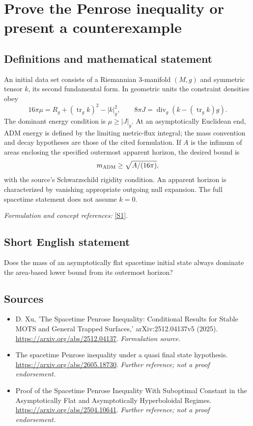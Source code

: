 \documentclass[11pt]{article}
\begin{document}
\section*{\texorpdfstring{Prove the Penrose inequality or present a counterexample}{Prove the Penrose inequality or present a counterexample}}\label{37}
\subsection{Definitions and mathematical statement}
An initial data set consists of a Riemannian $3$-manifold $(M,g)$ and symmetric tensor $k$, its second fundamental form. In geometric units the constraint densities obey
\[
 16\pi\mu=R_g+(\operatorname{tr}_gk)^2-|k|_g^2,\qquad
 8\pi J=\operatorname{div}_g(k-(\operatorname{tr}_gk)g).
\]
The dominant energy condition is $\mu\ge|J|_g$. At an asymptotically Euclidean end, ADM energy is defined by the limiting metric-flux integral; the mass convention and decay hypotheses are those of the cited formulation. If $A$ is the infimum of areas enclosing the specified outermost apparent horizon, the desired bound is
\[
 m_{\rm ADM}\ge\sqrt{A/(16\pi)},
\]
with the source's Schwarzschild rigidity condition. An apparent horizon is characterized by vanishing appropriate outgoing null expansion. The full spacetime statement does not assume $k=0$.
\par\smallskip\textit{Formulation and concept references:} \href{https://arxiv.org/abs/2512.04137}{[S1]}.

\subsection{Short English statement}
Does the mass of an asymptotically flat spacetime initial state always dominate the area-based lower bound from its outermost horizon?
\subsection{Sources}
\begin{itemize}
\item[S1]D. Xu, 'The Spacetime Penrose Inequality: Conditional Results for Stable MOTS and General Trapped Surfaces,' arXiv:2512.04137v5 (2025).
\url{https://arxiv.org/abs/2512.04137}.
\textit{Formulation source.}
\item[S2]The spacetime Penrose inequality under a quasi final state hypothesis.
\url{https://arxiv.org/abs/2605.18730}.
\textit{Further reference; not a proof endorsement.}
\item[S3]Proof of the Spacetime Penrose Inequality With Suboptimal Constant in the Asymptotically Flat and Asymptotically Hyperboloidal Regimes.
\url{https://arxiv.org/abs/2504.10641}.
\textit{Further reference; not a proof endorsement.}
\end{itemize}
\end{document}
